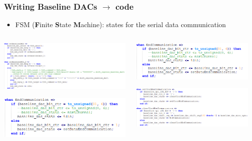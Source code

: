 \documentclass[aspectratio=169]{beamer}
\begin{document}
	\begin{frame}[fragile]
		\frametitle{Writing Baseline DACs $\rightarrow$ code}
		\begin{itemize}
			\item FSM (\textbf{F}inite \textbf{S}tate \textbf{M}achine): states for the serial data communication
		\end{itemize}
		{\tiny
		\begin{columns}
		
		\begin{center}
			\includegraphics[width=0.95 \textwidth]{IMG/SetbaselineDac.png}
			
			\vspace{1 cm}
			\includegraphics[width=0.85 \textwidth]{IMG/EndCommunication.png}
		\end{center}
		
	
		\begin{center}
			\includegraphics[width=0.85 \textwidth]{IMG/EndCommunication.png}
			
			\vspace{1 cm}
			\includegraphics[width=0.85 \textwidth]{IMG/EndCommunication2.png}
		\end{center}
	
		\end{columns}
	}
	\end{frame}
\end{document}
